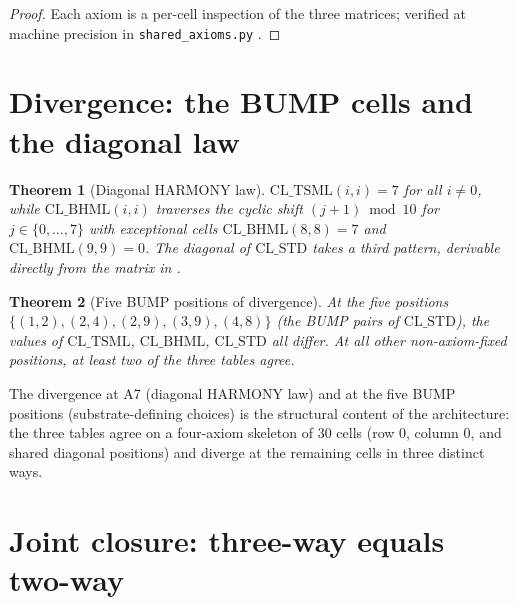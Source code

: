 \documentclass[11pt,reqno]{amsart}
\newtheorem{theorem}{Theorem}[section]
\theoremstyle{definition}
\newcommand{\TSML}{\mathrm{CL\_TSML}}
\newcommand{\BHML}{\mathrm{CL\_BHML}}
\newcommand{\STDx}{\mathrm{CL\_STD}}
\begin{document}
\begin{proof}
Each axiom is a per-cell inspection of the three matrices; verified
at machine precision in \texttt{shared\_axioms.py}
\cite{Gen13Foundations}.
\end{proof}

\section{Divergence: the BUMP cells and the diagonal law}
\label{sec:divergence}

\begin{theorem}[Diagonal HARMONY law]
\label{thm:diagonal}
$\TSML(i, i) = 7$ for all $i \neq 0$, while $\BHML(i, i)$ traverses
the cyclic shift $(j+1) \bmod 10$ for $j \in \{0, \ldots, 7\}$ with
exceptional cells $\BHML(8, 8) = 7$ and $\BHML(9, 9) = 0$. The
diagonal of $\STDx$ takes a third pattern, derivable directly from
the matrix in \cite{Gen13Foundations}.
\end{theorem}

\begin{theorem}[Five BUMP positions of divergence]
\label{thm:five-bumps}
At the five positions
$\{(1,2), (2,4), (2,9), (3,9), (4,8)\}$ (the BUMP pairs of $\STDx$),
the values of $\TSML$, $\BHML$, $\STDx$ all differ. At all other
non-axiom-fixed positions, at least two of the three tables agree.
\end{theorem}

The divergence at A7 (diagonal HARMONY law) and at the five BUMP
positions (substrate-defining choices) is the structural content of
the architecture: the three tables agree on a four-axiom skeleton
of $30$ cells (row $0$, column $0$, and shared diagonal positions)
and diverge at the remaining cells in three distinct ways.

\section{Joint closure: three-way equals two-way}
\label{sec:closure}
\end{document}
